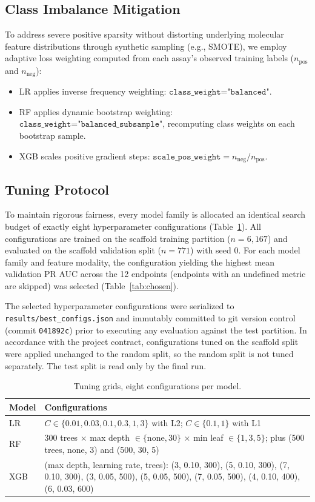 \subsection{Class Imbalance Mitigation}
To address severe positive sparsity without distorting underlying molecular feature distributions through synthetic sampling (e.g., SMOTE), we employ adaptive loss weighting computed from each assay's observed training labels ($n_{\mathrm{pos}}$ and $n_{\mathrm{neg}}$):
\begin{itemize}
    \item LR applies inverse frequency weighting: $\texttt{class\_weight="balanced"}$.
    \item RF applies dynamic bootstrap weighting: $\texttt{class\_weight="balanced\_subsample"}$, recomputing class weights on each bootstrap sample.
    \item XGB scales positive gradient steps: $\texttt{scale\_pos\_weight} = n_{\mathrm{neg}} / n_{\mathrm{pos}}$.
\end{itemize}

\subsection{Tuning Protocol}
To maintain rigorous fairness, every model family is allocated an identical search budget of exactly eight hyperparameter configurations (Table~\ref{tab:grids}). All configurations are trained on the scaffold training partition ($n=6{,}167$) and evaluated on the scaffold validation split ($n=771$) with seed 0. For each model family and feature modality, the configuration yielding the highest mean validation PR AUC across the 12 endpoints (endpoints with an undefined metric are skipped) was selected (Table~\ref{tab:chosen}).

The selected hyperparameter configurations were serialized to \texttt{results/best\_configs.json} and immutably committed to git version control (commit \texttt{041892c}) prior to executing any evaluation against the test partition. In accordance with the project contract, configurations tuned on the scaffold split were applied unchanged to the random split, so the random split is not tuned separately. The test split is read only by the final run.

\begin{table}[t]
\caption{Tuning grids, eight configurations per model.}
\label{tab:grids}
\centering\small
\begin{tabular}{@{}lp{}@{}}
\toprule
Model & Configurations \\
\midrule
LR  & $C \in \{0.01, 0.03, 0.1, 0.3, 1, 3\}$ with L2; $C \in \{0.1, 1\}$ with L1 \\
RF  & 300 trees $\times$ max depth $\in\{\text{none}, 30\}$ $\times$ min leaf $\in\{1, 3, 5\}$; plus (500 trees, none, 3) and (500, 30, 5) \\
XGB & (max depth, learning rate, trees): (3, 0.10, 300), (5, 0.10, 300), (7, 0.10, 300), (3, 0.05, 500), (5, 0.05, 500), (7, 0.05, 500), (4, 0.10, 400), (6, 0.03, 600) \\
\bottomrule
\end{tabular}
\end{table}


